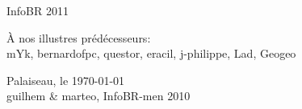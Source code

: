 \thispagestyle{empty}

\begin{center}
\begin{Huge}
InfoBR 2011
\end{Huge}
\end{center}


\begin{flushright}
\begin{large} 
 { \selectfont
\`A nos illustres pr\'ed\'ecesseurs:\\
\smallskip
mYk, bernardofpc, questor, eracil, j-philippe, Lad, Geogeo \\ }
\end{large}
\vspace{1cm}
{Palaiseau, le \today \\
\medskip
guilhem \& marteo, InfoBR-men 2010  }
\end{flushright} 



\newpage
\thispagestyle{empty}
\vspace*{1cm}
\newpage
